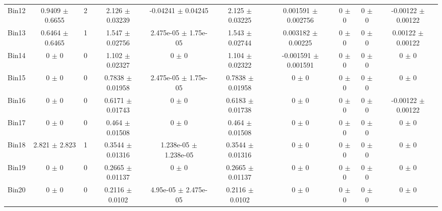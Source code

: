 \begin{tabular}{@{\extracolsep{4pt}}lccccccccc@{}}
     Bin12 & 0.9409 $\pm$ 0.6655 & 2 & 2.126 $\pm$ 0.03239 & -0.04241 $\pm$ 0.04245 & 2.125 $\pm$ 0.03225 & 0.001591 $\pm$ 0.002756 & 0 $\pm$ 0 & 0 $\pm$ 0 & -0.00122 $\pm$ 0.00122 \\ 
     Bin13 & 0.6464 $\pm$ 0.6465 & 1 & 1.547 $\pm$ 0.02756 & 2.475e-05 $\pm$ 1.75e-05 & 1.543 $\pm$ 0.02744 & 0.003182 $\pm$ 0.00225 & 0 $\pm$ 0 & 0 $\pm$ 0 & 0.00122 $\pm$ 0.00122 \\ 
     Bin14 & 0 $\pm$ 0 & 0 & 1.102 $\pm$ 0.02327 & 0 $\pm$ 0 & 1.104 $\pm$ 0.02322 & -0.001591 $\pm$ 0.001591 & 0 $\pm$ 0 & 0 $\pm$ 0 & 0 $\pm$ 0 \\ 
     Bin15 & 0 $\pm$ 0 & 0 & 0.7838 $\pm$ 0.01958 & 2.475e-05 $\pm$ 1.75e-05 & 0.7838 $\pm$ 0.01958 & 0 $\pm$ 0 & 0 $\pm$ 0 & 0 $\pm$ 0 & 0 $\pm$ 0 \\ 
     Bin16 & 0 $\pm$ 0 & 0 & 0.6171 $\pm$ 0.01743 & 0 $\pm$ 0 & 0.6183 $\pm$ 0.01738 & 0 $\pm$ 0 & 0 $\pm$ 0 & 0 $\pm$ 0 & -0.00122 $\pm$ 0.00122 \\ 
     Bin17 & 0 $\pm$ 0 & 0 & 0.464 $\pm$ 0.01508 & 0 $\pm$ 0 & 0.464 $\pm$ 0.01508 & 0 $\pm$ 0 & 0 $\pm$ 0 & 0 $\pm$ 0 & 0 $\pm$ 0 \\ 
     Bin18 & 2.821 $\pm$ 2.823 & 1 & 0.3544 $\pm$ 0.01316 & 1.238e-05 $\pm$ 1.238e-05 & 0.3544 $\pm$ 0.01316 & 0 $\pm$ 0 & 0 $\pm$ 0 & 0 $\pm$ 0 & 0 $\pm$ 0 \\ 
     Bin19 & 0 $\pm$ 0 & 0 & 0.2665 $\pm$ 0.01137 & 0 $\pm$ 0 & 0.2665 $\pm$ 0.01137 & 0 $\pm$ 0 & 0 $\pm$ 0 & 0 $\pm$ 0 & 0 $\pm$ 0 \\ 
     Bin20 & 0 $\pm$ 0 & 0 & 0.2116 $\pm$ 0.0102 & 4.95e-05 $\pm$ 2.475e-05 & 0.2116 $\pm$ 0.0102 & 0 $\pm$ 0 & 0 $\pm$ 0 & 0 $\pm$ 0 & 0 $\pm$ 0 \\ 
\hline\hline
  \end{tabular}
